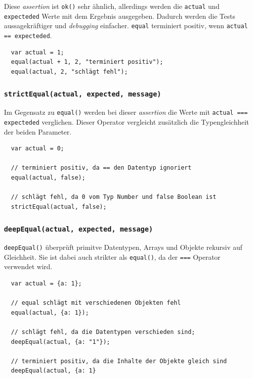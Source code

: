 \documentclass[11pt, a4paper]{article}
\begin{document}
Diese \emph{assertion} ist \texttt{ok()} sehr ähnlich, allerdings werden die
\texttt{actual} und \texttt{expecteded} Werte mit dem Ergebnis ausgegeben. Dadurch
werden die Tests aussagekräftiger und \emph{debugging} einfacher.
\texttt{equal} terminiert positiv, wenn \texttt{actual == expecteded}. 

\begin{verbatim}
  var actual = 1;
  equal(actual + 1, 2, "terminiert positiv");
  equal(actual, 2, "schlägt fehl");
\end{verbatim}

\subsubsection*{\texttt{strictEqual(actual, expected, message)}}

Im Gegensatz zu \texttt{equal()} werden bei dieser \emph{assertion} die Werte
mit \texttt{actual === expecteded} verglichen. Dieser Operator vergleicht
zusätzlich die Typengleichheit der beiden Parameter.

\begin{verbatim}
  var actual = 0;

  // terminiert positiv, da == den Datentyp ignoriert
  equal(actual, false);

  // schlägt fehl, da 0 vom Typ Number und false Boolean ist
  strictEqual(actual, false);
\end{verbatim}

\subsubsection*{\texttt{deepEqual(actual, expected, message)}}

\texttt{deepEqual()} überprüft primitve Datentypen, Arrays und Objekte
rekursiv auf Gleichheit. Sie ist dabei auch strikter als \texttt{equal()}, da
der \texttt{===} Operator verwendet wird.

\begin{verbatim}
  var actual = {a: 1};

  // equal schlägt mit verschiedenen Objekten fehl
  equal(actual, {a: 1});

  // schlägt fehl, da die Datentypen verschieden sind;
  deepEqual(actual, {a: "1"});

  // terminiert positiv, da die Inhalte der Objekte gleich sind
  deepEqual(actual, {a: 1}
\end{verbatim}
\end{document}
